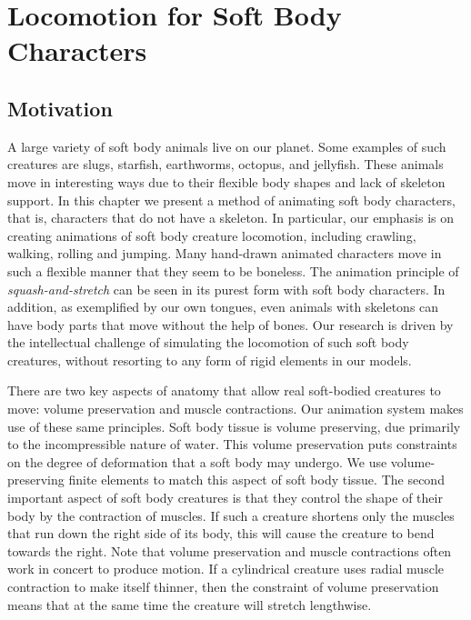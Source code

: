 \chapter{Locomotion for Soft Body Characters}

\section{Motivation}

A large variety of soft body animals live on our planet. Some examples of
such creatures are slugs, starfish, earthworms, octopus, and jellyfish. These
animals move in interesting ways due to their flexible body shapes and lack of
skeleton support. In this chapter we present a method of animating soft body characters, that
is, characters that do not have a skeleton.  In particular, our emphasis
is on creating animations of soft body creature locomotion, including
crawling, walking, rolling and jumping.  
Many hand-drawn animated characters move in such a flexible
manner that they seem to be boneless.  The animation principle of
\emph{squash-and-stretch} can be seen in its purest form with soft body
characters. In addition, as exemplified by our own tongues, even animals with
skeletons can have body parts that move without the help of
bones.  Our research is driven by the intellectual challenge of
simulating the locomotion of such soft body creatures, without resorting
to any form of rigid elements in our models.

There are two key aspects of anatomy that allow real soft-bodied creatures
to move: volume preservation and muscle contractions.  Our animation
system makes use of these same principles.  Soft body tissue is volume
preserving, due primarily to the incompressible nature of water.  This
volume preservation puts constraints on the degree of deformation that a
soft body may undergo.  We use volume-preserving finite elements to match
this aspect of soft body tissue.  The second important aspect of soft body
creatures is that they control the shape of their body by the contraction of
muscles.  If such a creature shortens only the muscles that run down the
right side of its body, this will cause the creature to bend towards the
right.  Note that volume preservation and muscle contractions often work
in concert to produce motion.  If a cylindrical creature uses radial
muscle contraction to make itself thinner, then the constraint of volume
preservation means that at the same time the creature will stretch
lengthwise.

